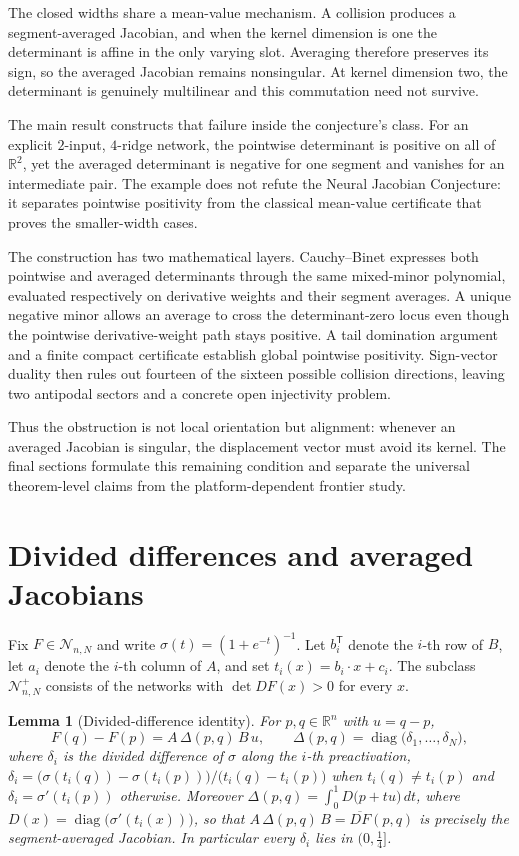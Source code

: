 \documentclass[11pt]{article}
\newtheorem{lemma}[theorem]{Lemma}
\theoremstyle{definition}
\theoremstyle{remark}
\newcommand{\R}{\mathbb{R}}
\begin{document}
The closed widths share a mean-value mechanism. A collision produces a segment-averaged Jacobian,
and when the kernel dimension is one the determinant is affine in the only varying slot. Averaging
therefore preserves its sign, so the averaged Jacobian remains nonsingular. At kernel dimension two,
the determinant is genuinely multilinear and this commutation need not survive.

The main result constructs that failure inside the conjecture's class. For an explicit
$2$-input, $4$-ridge network, the pointwise determinant is positive on all of $\mathbb R^2$, yet the
averaged determinant is negative for one segment and vanishes for an intermediate pair. The example
does not refute the Neural Jacobian Conjecture: it separates pointwise positivity from the classical
mean-value certificate that proves the smaller-width cases.

The construction has two mathematical layers. Cauchy--Binet expresses both pointwise and averaged
determinants through the same mixed-minor polynomial, evaluated respectively on derivative weights
and their segment averages. A unique negative minor allows an average to cross the determinant-zero
locus even though the pointwise derivative-weight path stays positive. A tail domination argument
and a finite compact certificate establish global pointwise positivity. Sign-vector duality then
rules out fourteen of the sixteen possible collision directions, leaving two antipodal sectors and a
concrete open injectivity problem.

Thus the obstruction is not local orientation but alignment: whenever an averaged Jacobian is
singular, the displacement vector must avoid its kernel. The final sections formulate this remaining
condition and separate the universal theorem-level claims from the platform-dependent frontier study.

\section{Divided differences and averaged Jacobians}\label{sec:setting}

Fix $F\in\mathcal N_{n,N}$ and write
$\sigma(t)=(1+e^{-t})^{-1}$. Let $b_i^{\mathsf T}$ denote the $i$-th row of
$B$, let $a_i$ denote the $i$-th column of $A$, and set
$t_i(x)=b_i\cdot x+c_i$. The subclass $\mathcal N^+_{n,N}$ consists of the
networks with $\det DF(x)>0$ for every $x$.

\begin{lemma}[Divided-difference identity]\label{lem:dd}
For $p,q\in\R^n$ with $u=q-p$,
\[
F(q)-F(p)=A\,\Delta(p,q)\,B\,u,
\qquad
\Delta(p,q)=\operatorname{diag}\bigl(\delta_1,\dots,\delta_N\bigr),
\]
where $\delta_i$ is the divided difference of $\sigma$ along the $i$-th
preactivation,
$\delta_i=\bigl(\sigma(t_i(q))-\sigma(t_i(p))\bigr)/\bigl(t_i(q)-t_i(p)\bigr)$
when $t_i(q)\ne t_i(p)$ and $\delta_i=\sigma'(t_i(p))$ otherwise. Moreover
$\Delta(p,q)=\int_0^1 D\bigl(p+tu\bigr)\,dt$, where
$D(x)=\operatorname{diag}\bigl(\sigma'(t_i(x))\bigr)$, so that
$A\,\Delta(p,q)\,B=\overline{DF}(p,q)$ is precisely the segment-averaged
Jacobian. In particular every $\delta_i$ lies in $(0,\tfrac14]$.
\end{lemma}
\end{document}

